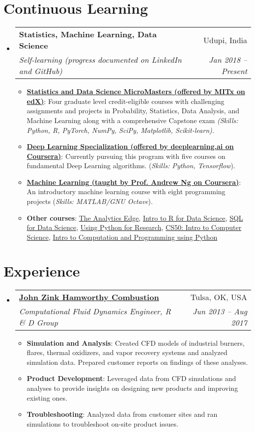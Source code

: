 \documentclass[letterpaper,11pt]{article}
\makeatletter
\newcommand{\resumeItem}[2]{
	\item\small{
		\textbf{#1}{: #2 \vspace{-2pt}}
	}
}
\newcommand{\resumeSubheading}[4]{
	\vspace{-1pt}\item
	\begin{tabular*}{0.97\textwidth}[t]{l@{\extracolsep{\fill}}r}
		\textbf{#1} & #2 \\
		\textit{\small#3} & \textit{\small #4} \\
	\end{tabular*}\vspace{-5pt}
}
\newcommand{\resumeSubHeadingListStart}{\begin{itemize}[leftmargin=*]}
\newcommand{\resumeSubHeadingListEnd}{\end{itemize}}
\newcommand{\resumeItemListStart}{\begin{itemize}}
\newcommand{\resumeItemListEnd}{\end{itemize}\vspace{-5pt}}
\makeatother
\begin{document}
	\section{Continuous Learning}
	\resumeSubHeadingListStart
	\resumeSubheading
	{Statistics, Machine Learning, Data Science}{Udupi, India}
	{Self-learning (progress documented on LinkedIn and GitHub)}{Jan 2018 -- Present}
	\resumeItemListStart
	\resumeItem{\href{https://www.edx.org/micromasters/mitx-statistics-and-data-science/}{Statistics and Data Science MicroMasters (offered by MITx on edX)}}
	{Four graduate level credit-eligible courses with challenging assignments and projects in Probability, Statistics, Data Analysis, and Machine Learning along with a comprehensive Capstone exam \textit {\small (Skills: Python, R, PyTorch, NumPy, SciPy, Matplotlib, Scikit-learn).}}
	\resumeItem{\href{https://www.coursera.org/specializations/deep-learning/}{Deep Learning Specialization (offered by deeplearning.ai on Coursera)}}
	{Currently pursuing this program with five courses on fundamental Deep Learning algorithms. (\textit{\small Skills: Python, Tensorflow}).}
	\resumeItem{\href{https://www.coursera.org/learn/machine-learning/}{Machine Learning (taught by Prof. Andrew Ng on Coursera)}}
	{An introductory machine learning course with eight programming projects (\textit{\small Skills: MATLAB/GNU Octave}).}
	\resumeItem{Other courses}
	{\href{https://www.edx.org/course/the-analytics-edge-2/}{The Analytics Edge}, \href{https://www.edx.org/course/introduction-to-r-for-data-science-3/}{Intro to R for Data Science}, \href{https://www.coursera.org/learn/sql-for-data-science/}{SQL for Data Science},  \href{https://www.edx.org/course/using-python-for-research-2}{Using Python for Research},  \href{https://www.edx.org/course/cs50s-introduction-computer-science-harvardx-cs50x/}{CS50: Intro to Computer Science}, \href{https://www.edx.org/course/6-00-1x-introduction-to-computer-science-and-programming-using-python-3/}{Intro to Computation and Programming using Python}}
	\resumeItemListEnd
	\resumeSubHeadingListEnd

	\section{Experience}
	\resumeSubHeadingListStart
	
	\resumeSubheading
	{\href{https://www.johnzinkhamworthy.com/}{John Zink Hamworthy Combustion}}{Tulsa, OK, USA}
	{Computational Fluid Dynamics Engineer, R \& D Group}{Jun 2013 -- Aug 2017}
	\resumeItemListStart
	\resumeItem{Simulation and Analysis}
	{Created CFD models of industrial burners, flares, thermal oxidizers, and vapor recovery systems and analyzed simulation data. Prepared customer reports on findings of these analyses.}
	\resumeItem{Product Development}
	{Leveraged data from CFD simulations and analyses to provide insights on designing new products and improving existing ones.}
	\resumeItem{Troubleshooting}
	{Analyzed data from customer sites and ran simulations to troubleshoot on-site product issues.}
	\resumeItemListEnd
	\resumeSubHeadingListEnd
	
\end{document}
